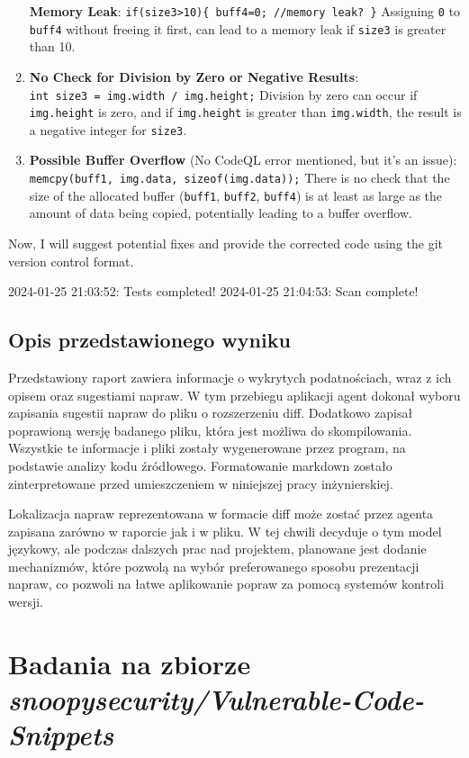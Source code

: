 \begin{enumerate}
  \textbf{Memory Leak}:
  \texttt{if(size3\textgreater{}10)\{\ buff4=0;\ //memory\ leak?\ \}}
  Assigning \texttt{0} to \texttt{buff4} without freeing it first, can
  lead to a memory leak if \texttt{size3} is greater than 10.
\item
  \textbf{No Check for Division by Zero or Negative Results}:
  \texttt{int\ size3\ =\ img.width\ /\ img.height;} Division by zero can
  occur if \texttt{img.height} is zero, and if \texttt{img.height} is
  greater than \texttt{img.width}, the result is a negative integer for
  \texttt{size3}.
\item
  \textbf{Possible Buffer Overflow} (No CodeQL error mentioned, but it's
  an issue): \texttt{memcpy(buff1,\ img.data,\ sizeof(img.data));} There
  is no check that the size of the allocated buffer (\texttt{buff1},
  \texttt{buff2}, \texttt{buff4}) is at least as large as the amount of
  data being copied, potentially leading to a buffer overflow.
\end{enumerate}

Now, I will suggest potential fixes and provide the corrected code using
the git version control format.

2024-01-25 21:03:52: Tests completed! 2024-01-25 21:04:53: Scan complete!

\subsection{Opis przedstawionego wyniku}

Przedstawiony raport zawiera informacje o wykrytych podatnościach, wraz z ich opisem oraz sugestiami napraw. W tym przebiegu aplikacji agent dokonał wyboru zapisania sugestii napraw do pliku o rozszerzeniu diff. Dodatkowo zapisał poprawioną wersję badanego pliku, która jest możliwa do skompilowania. Wszystkie te informacje i pliki zostały wygenerowane przez program, na podstawie analizy kodu źródłowego. Formatowanie markdown zostało zinterpretowane przed umieszczeniem w niniejszej pracy inżynierskiej.

Lokalizacja napraw reprezentowana w formacie diff może zostać przez agenta zapisana zarówno w raporcie jak i w pliku. W tej chwili decyduje o tym model językowy, ale podczas dalszych prac nad projektem, planowane jest dodanie mechanizmów, które pozwolą na wybór preferowanego sposobu prezentacji napraw, co pozwoli na łatwe aplikowanie popraw za pomocą systemów kontroli wersji.
\newpage
\section{Badania na zbiorze \textit{snoopysecurity/Vulnerable-Code-Snippets}}
\label{sec:badania_na_zbiorze_snoopysecurity}

